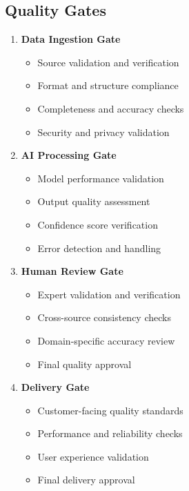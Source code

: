 \documentclass[business]{../templates/infraradar-main}
\begin{document}
\subsection{Quality Gates}
\begin{enumerate}
    \item \textbf{Data Ingestion Gate}
    \begin{itemize}
        \item Source validation and verification
        \item Format and structure compliance
        \item Completeness and accuracy checks
        \item Security and privacy validation
    \end{itemize}
    
    \item \textbf{AI Processing Gate}
    \begin{itemize}
        \item Model performance validation
        \item Output quality assessment
        \item Confidence score verification
        \item Error detection and handling
    \end{itemize}
    
    \item \textbf{Human Review Gate}
    \begin{itemize}
        \item Expert validation and verification
        \item Cross-source consistency checks
        \item Domain-specific accuracy review
        \item Final quality approval
    \end{itemize}
    
    \item \textbf{Delivery Gate}
    \begin{itemize}
        \item Customer-facing quality standards
        \item Performance and reliability checks
        \item User experience validation
        \item Final delivery approval
    \end{itemize}
\end{enumerate}
\end{document}
